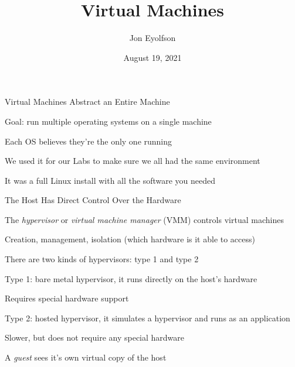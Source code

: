 

\title{Virtual Machines}
\author{Jon Eyolfson}
\date{August 19, 2021}


  \begin{frame}
    \titlepage
  \end{frame}

  \begin{frame}{Virtual Machines Abstract an Entire Machine}

    Goal: run multiple operating systems on a single machine

    \hspace{2em} Each OS believes they're the only one running

    \vspace{2em}

    We used it for our Labs to make sure we all had the same environment

    \hspace{2em} It was a full Linux install with all the software you needed
  \end{frame}

  \begin{frame}{The Host Has Direct Control Over the Hardware}

    The \textit{hypervisor} or \textit{virtual machine manager} (VMM) controls
    virtual machines

    \hspace{2em} Creation, management, isolation (which hardware is it able to
    access)

    \vspace{2em}

    There are two kinds of hypervisors: type 1 and type 2

    \hspace{2em} Type 1: bare metal hypervisor, it runs directly on the host's
    hardware

    \hspace{4em} Requires special hardware support

    \hspace{2em} Type 2: hosted hypervisor, it simulates a hypervisor and runs
                 as an application

    \hspace{4em} Slower, but does not require any special hardware

    \vspace{2em}

    A \textit{guest} sees it's own virtual copy of the host
  \end{frame}

